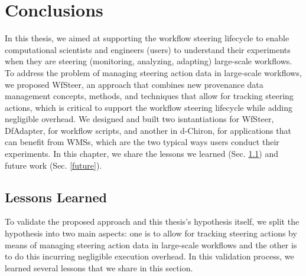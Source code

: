 \chapter{Conclusions} \label{chap7}

In this thesis, we aimed at supporting the workflow steering lifecycle to enable computational scientists and engineers (users) to understand their experiments when they are steering (monitoring, analyzing, adapting) large-scale workflows.
To address the problem of managing steering action data in large-scale workflows, we proposed WfSteer, an approach that combines new provenance data management concepts, methods, and techniques that allow for tracking steering actions, which is critical to support the workflow steering lifecycle while adding negligible overhead. We designed and built two isntantiations for WfSteer, \ie{} DfAdapter, for workflow scripts, and another in d-Chiron, for applications that can benefit from WMSs, which are the two typical ways users conduct their experiments. In this chapter, we share the lessons we learned (Sec. \ref{lessons}) and future work (Sec. \ref{future}).

\section{Lessons Learned}
\label{lessons}

To validate the proposed approach and this thesis's  hypothesis itself, we split the hypothesis into two main aspects:
one is to allow for tracking steering actions by means of managing steering action data in large-scale workflows and the other is to
do this incurring negligible execution overhead.
In this validation process, we learned several lessons that we share in this section.

